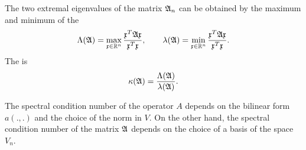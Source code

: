 \begin{definition}
  The two extremal eigenvalues of the matrix $\mathfrak{A}_n$ can be
  obtained by the maximum and minimum of the 
  \begin{gather}
    \label{eq:itintro:3}
    \Lambda(\mathfrak{A}) = \max_{\mathfrak{x}\in \mathbb R^n}\frac{\mathfrak{x}^T \mathfrak{A} \mathfrak{x}}{\mathfrak{x}^T\mathfrak{x}},
    \qquad
    \lambda(\mathfrak{A}) = \min_{\mathfrak{x}\in \mathbb R^n}\frac{\mathfrak{x}^T \mathfrak{A} \mathfrak{x}}{\mathfrak{x}^T\mathfrak{x}}.
  \end{gather}
  The  is
  \begin{gather*}
    \kappa(\mathfrak{A}) = \frac{\Lambda(\mathfrak{A})}{\lambda(\mathfrak{A})}.
  \end{gather*}
\end{definition}

\begin{note}
  The spectral condition number of the operator $A$ depends on the
  bilinear form $a(.,.)$ and the choice of the norm in $V$. On the
  other hand, the spectral condition number of the matrix $\mathfrak{A}$
  depends on the choice of a basis of the space $V_n$.
\end{note}

